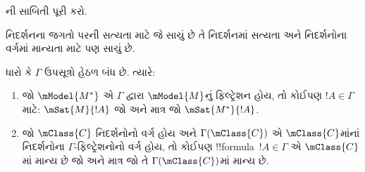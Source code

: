 \documentclass[../../../include/open-logic-section]{subfiles}
\begin{document}
\begin{prob}
  ની સાબિતી પૂરી કરો.
\end{prob}

નિદર્શનના જગતો પરની સત્યતા માટે જે સાચું છે તે નિદર્શનમાં સત્યતા
અને નિદર્શનોના વર્ગમાં માન્યતા માટે પણ સાચું છે.

\begin{cor}
  ધારો કે $\Gamma$ ઉપસૂત્રો હેઠળ બંધ છે. ત્યારે:
  \begin{enumerate}
  \item જો $\mModel{M^*}$ એ $\Gamma$ દ્વારા $\mModel{M}$નું
    ફિલ્ટ્રેશન હોય, તો કોઈપણ $!A \in \Gamma$ માટે:
    $\mSat{M}{!A}$ જો અને માત્ર જો $\mSat{M^*}{!A}$.
  \item જો $\mClass{C}$ નિદર્શનોનો વર્ગ હોય અને
    $\Gamma(\mClass{C})$ એ $\mClass{C}$માંનાં નિદર્શનોના
    $\Gamma$-ફિલ્ટ્રેશનોનો વર્ગ હોય, તો કોઈપણ
    !!{formula}~$!A \in \Gamma$ એ $\mClass{C}$માં માન્ય છે
    જો અને માત્ર જો તે $\Gamma(\mClass{C})$માં માન્ય છે.
  \end{enumerate}
\end{cor}
\end{document}
